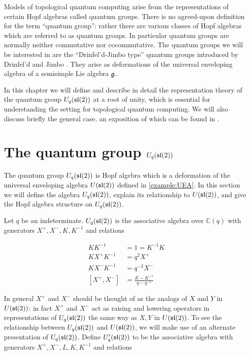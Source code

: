 Models of topological quantum computing arise from the representations of
certain Hopf algebras called quantum groups. There is no agreed-upon definition
for the term ``quantum group'': rather there are various classes of Hopf
algebras which are referred to as quantum groups. In particular quantum groups
are normally neither commutative nor cocommutative. The quantum groups we will
be interested in are the ``Drinfel'd-Jimbo type'' quantum groups introduced by
Drinfel'd and Jimbo . They arise as deformations of the
universal enveloping algebra of a semisimple Lie algebra $\mathfrak{g}$.

In this chapter we will define and describe in detail the representation theory
of the quantum group $U_q(\mathfrak{sl}(2))$ at a root of unity, which is essential for
understanding the setting for topological quantum computing. We will also
discuss briefly the general case, an exposition of which can be found in
\cite{CP}.

\section{The quantum group $U_q(\mathfrak{sl}(2))$}
\label{UqSL2}


The quantum group $U_q(\mathfrak{sl}(2))$ is Hopf algebra which is a deformation of the
universal enveloping algebra $U(\mathfrak{sl}(2))$ defined in \ref{example:UEA}.  In this
section we will define the algebra $U_q(\mathfrak{sl}(2))$, explain its relationship to 
$U(\mathfrak{sl}(2))$, and give the Hopf algebra structure on $U_q(\mathfrak{sl}(2))$.

\begin{defn}
\label{Uqsl2Def}
Let $q$ be an indeterminate. $U_q(\mathfrak{sl}(2))$ is the associative algebra over
$\mathbb{C}(q)$ with generators $X^+,X^-,K, K^{-1}$ and relations 

\begin{align}
    KK^{-1} &= 1 = K^{-1}K \\
    K X^+ K^{-1} &= q^2  X^+  \\
    KX^-K^{-1} &= q^{-2} X^- \\
    [ X^+ ,X^-] &= \frac{K - K^{-1}}{q - q^{-1}}
\end{align}
\end{defn}

In general $ X^+ $ and $X^-$ should be thought of as the analogs of $X$ and $Y$
in $U(\mathfrak{sl}(2))$: in fact $X^+$ and $X^-$ act as raising and lowering operators
in representations of $U_q(\mathfrak{sl}(2))$ the same way as $X,Y$ in $U(\mathfrak{sl}(2))$. To
see the relationship between $U_q(\mathfrak{sl}(2))$ and $U(\mathfrak{sl}(2))$, we will make use
of an alternate presentation of $U_q(\mathfrak{sl}(2))$.  Define $U'_q(\mathfrak{sl}(2))$ to be
the associative algebra with generators $ X^+ ,X^-,L,K,K^{-1}$ and relations

